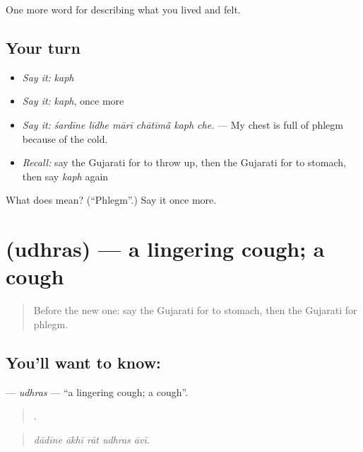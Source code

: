 \begin{grammarlens}[title={What you've built}]
One more word for describing what you lived and felt.
\end{grammarlens}

\subsection*{Your turn}
\begin{itemize}
\raggedright
  \item \emph{Say it:} \emph{kaph}
  \item \emph{Say it:} \emph{kaph}, once more
  \item \emph{Say it:} \emph{śardīne līdhe mārī chātīmā̃ kaph che.} — My chest is full of phlegm because of the cold.
  \item \emph{Recall:} say the Gujarati for to throw up, then the Gujarati for to stomach, then say \emph{kaph} again
\end{itemize}

\begin{tcolorbox}[breakable,colback=teal!4,colframe=teal!35!black,title={Before you move on}]
What does  mean? (\textquotedblleft{}Phlegm\textquotedblright{}.) Say it once more.
\end{tcolorbox}
\section[\texorpdfstring{\gu{ઉધરસ} (udhras)}{ઉધરસ (udhras)}]{ (udhras) — a lingering cough; a cough}

\label{lesson:GU-C478-udhras}



\begin{quote}
Before the new one: say the Gujarati for to stomach, then the Gujarati for phlegm.
\end{quote}

\subsection*{You'll want to know: }
\textbf{} — \emph{udhras} — \textquotedblleft{}a lingering cough; a cough\textquotedblright{}.

\begin{quote}
    .
\end{quote}

\begin{quote}
\emph{dādīne ākhī rāt udhras āvī.}
\end{quote}

